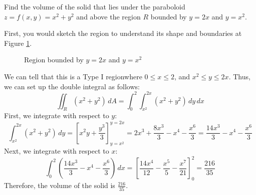 \documentclass[11pt]{report}
\begin{document}
\begin{example}
    Find the volume of the solid that lies under the paraboloid $z = f(x,y) = x^2 + y^2$ and above the region $R$ bounded
     by $y = 2x$ and $y = x^2$.

     First, you would sketch the region to understand its shape and boundaries at Figure \ref{fig:region}.

    \begin{figure}[h]
        \centering
        \caption{Region bounded by $y = 2x$ and $y = x^2$} \label{fig:region}
    \end{figure}

    We can tell that this is a Type I regionwhere $0 \le x \le 2$, and $x^2 \le y \le 2x$. Thus, we can set up the double integral as follows:
    $$
        \iint_R (x^2 + y^2) \, dA = \int_0^2 \int_{x^2}^{2x} (x^2 + y^2) \, dy \, dx
    $$
    First, we integrate with respect to $y$:
    $$
        \int_{x^2}^{2x} (x^2 + y^2) \, dy = \left[ x^2y + \frac{y^3}{3} \right]_{y=x^2}^{y=2x} = 2x^3 + \frac{8x^3}{3} - x^4 - \frac{x^6}{3} = \frac{14x^3}{3} - x^4 - \frac{x^6}{3}
    $$
    Next, we integrate with respect to $x$:
    $$
        \int_0^2 \left( \frac{14x^3}{3} - x^4 - \frac{x^6}{3} \right) \, dx = \left[ \frac{14x^4}{12} - \frac{x^5}{5} - \frac{x^7}{21} \right]_0^2 = \frac{216}{35}
    $$
    Therefore, the volume of the solid is $\frac{216}{35}$.

\end{example}
\end{document}
